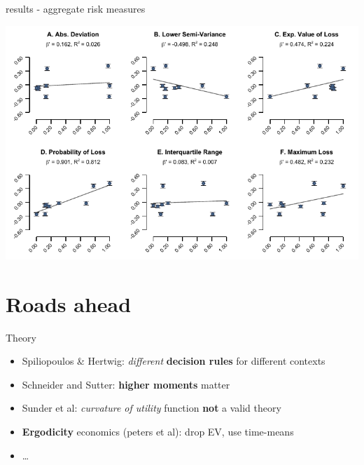 \documentclass[
  ignorenonframetext,
]{beamer}
\providecommand{\tightlist}{%
  \setlength{\itemsep}{0pt}\setlength{\parskip}{0pt}}
\begin{document}
\begin{frame}{results - aggregate risk measures}
\protect\hypertarget{results---aggregate-risk-measures}{}

\includegraphics[width=8.33333in,height=\textheight]{zeisberger.png}

\end{frame}

\hypertarget{roads-ahead}{%
\section{Roads ahead}\label{roads-ahead}}

\begin{frame}{Theory}
\protect\hypertarget{theory}{}

\begin{itemize}
\tightlist
\item
  Spiliopoulos \& Hertwig: \emph{different} \textbf{decision rules} for
  different contexts
\item
  Schneider and Sutter: \textbf{higher moments} matter
\item
  Sunder et al: \emph{curvature of utility} function \textbf{not} a
  valid theory
\item
  \textbf{Ergodicity} economics (peters et al): drop EV, use time-means
\item
  \ldots{}
\end{itemize}

\end{frame}
\end{document}
